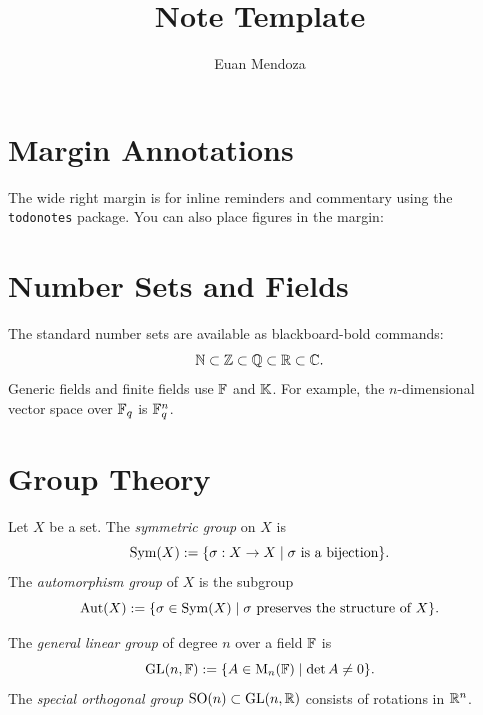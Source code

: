 \documentclass[12pt]{article}
\title{
    Note Template
}
\author{
    Euan Mendoza
}
\begin{document}
\maketitle


\section{Margin Annotations}

The wide right margin is for  inline reminders
and commentary using the \texttt{todonotes} package.
You can also place figures in the margin:

\section{Number Sets and Fields}

The standard number sets are available as blackboard-bold commands:
\[
    \mathbb{N} \subset \mathbb{Z} \subset \mathbb{Q} \subset \mathbb{R} \subset \mathbb{C}.
\]
Generic fields and finite fields use $\mathbb{F}$ and $\mathbb{K}$.
For example, the $n$-dimensional vector space over $\mathbb{F}_{q}$ is $\mathbb{F}_{q}^{n}$.

\section{Group Theory}

\begin{definition}
    Let $X$ be a set. The \emph{symmetric group} on $X$ is
    \[
        \mathrm{Sym}(X) := \{ \sigma : X \to X \mid \sigma \text{ is a bijection} \}.
    \]
    The \emph{automorphism group} of $X$ is the subgroup
    \[
        \mathrm{Aut}(X) := \{ \sigma \in \mathrm{Sym}(X) \mid \sigma \text{ preserves the structure of } X \}.
    \]
\end{definition}

\begin{definition}
    The \emph{general linear group} of degree $n$ over a field $\mathbb{F}$ is
    \[
        \mathrm{GL}(n, \mathbb{F}) := \{ A \in \mathrm{M}_{n}(\mathbb{F}) \mid \det A \neq 0 \}.
    \]
    The \emph{special orthogonal group} $\mathrm{SO}(n) \subset \mathrm{GL}(n, \mathbb{R})$ consists of
    rotations in $\mathbb{R}^{n}$.
\end{definition}
\end{document}
